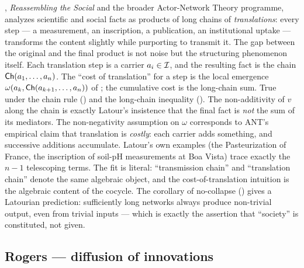 \begin{zooentry*}
, \emph{Reassembling the Social}
\cite{Latour2005} and the broader Actor-Network Theory programme,
analyzes scientific and social facts as products of long chains of
\emph{translations}: every step --- a measurement, an inscription, a
publication, an institutional uptake --- transforms the content
slightly while purporting to transmit it. The gap between the
original and the final product is not noise but the structuring
phenomenon itself.
\formalclaim Each translation step is a carrier $a_i\in\mathcal{I}$, and
the resulting fact is the chain $\mathsf{Ch}(a_1,\dots,a_n)$. The
``cost of translation'' for a step is the local emergence
$\omega(a_k,\mathsf{Ch}(a_{k+1},\dots,a_n))$ of ;
the cumulative cost is the long-chain sum.
\formalstatus
True under the chain rule () and the long-chain
inequality (). The non-additivity of $v$ along
the chain is exactly Latour's insistence that the final fact is
\emph{not} the sum of its mediators. The non-negativity assumption on
$\omega$ corresponds to ANT's empirical claim that translation is
\emph{costly}: each carrier adds something, and successive additions
accumulate. Latour's own examples (the Pasteurization of France, the
inscription of soil-pH measurements at Boa Vista) trace exactly the
$n-1$ telescoping terms.
\litcomment
The fit is literal: ``transmission chain'' and ``translation chain''
denote the same algebraic object, and the cost-of-translation
intuition is the algebraic content of the cocycle. The corollary of
no-collapse () gives a Latourian prediction:
sufficiently long networks always produce non-trivial output, even
from trivial inputs --- which is exactly the assertion that
``society'' is constituted, not given.
\end{zooentry*}

\subsection{Rogers --- diffusion of innovations}\label{zoo:rogers}

